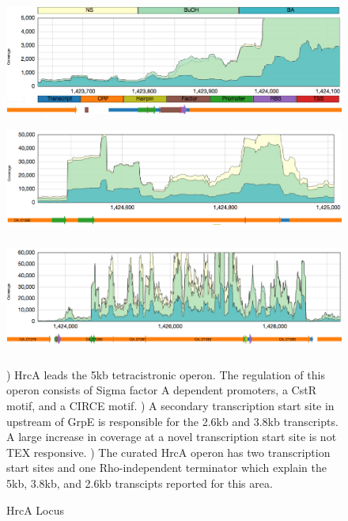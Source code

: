 \begin{figure}
{\includegraphics[width=\textwidth,height=1.5in]{images/Assembly/Examples/HrcA/HrcA-TSS.png}
\label{fig:8a}}
{\includegraphics[width=\textwidth,height=1.5in]{images/Assembly/Examples/HrcA/GrpE-TSS.png}
\label{fig:8b}}
{\includegraphics[width=\textwidth,height=1.5in]{images/Assembly/Examples/HrcA/HrcA-operon-curated.png}
\label{fig:8c}}
\caption{HrcA Locus}
) HrcA leads the 5kb tetracistronic operon. The regulation of this operon consists of Sigma factor A dependent promoters, a CstR motif, and a CIRCE motif. ) A secondary transcription start site in upstream of GrpE is responsible for the 2.6kb and 3.8kb transcripts. A large increase in coverage at a novel transcription start site is not TEX responsive. ) The curated HrcA operon has two transcription start sites and one Rho-independent terminator which explain the 5kb, 3.8kb, and 2.6kb transcipts reported for this area.
\end{figure}


